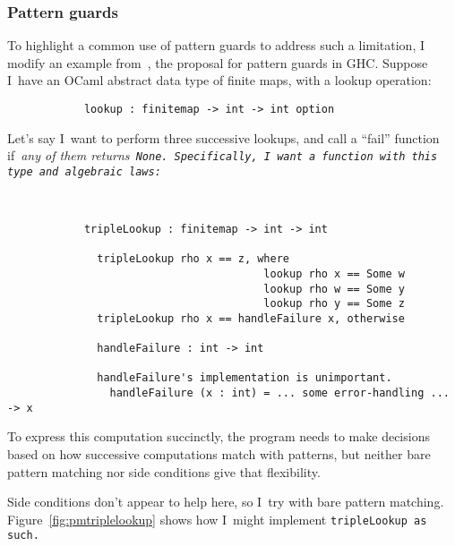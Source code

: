 \documentclass[manuscript,screen 12pt, nonacm]{acmart}
\begin{document}
    \subsubsection{Pattern guards}
    \label{guards}

    To highlight a common use of pattern guards to address such a limitation, I
    modify an example from~\citet{guardproposal}, the proposal for pattern
    guards in GHC. Suppose I~have an OCaml abstract data type of finite maps,
    with a lookup operation: 

    \begin{minipage}[t]{\textwidth}
        \centering 
        \begin{verbatim}
            lookup : finitemap -> int -> int option
        \end{verbatim}
    \end{minipage}
    Let's say I~want to perform three successive lookups, and call a “fail”
    function if~\it{any} of them returns~\tt{None}. Specifically, I~want a
    function with this type and algebraic laws: 

    \begin{minipage}[t]{\textwidth}
        \centering 
        \begin{verbatim}
          

            tripleLookup : finitemap -> int -> int

              tripleLookup rho x == z, where 
                                        lookup rho x == Some w
                                        lookup rho w == Some y
                                        lookup rho y == Some z
              tripleLookup rho x == handleFailure x, otherwise
            
              handleFailure : int -> int 

              handleFailure's implementation is unimportant.
                handleFailure (x : int) = ... some error-handling ... -> x  

        \end{verbatim}
    \end{minipage}

    To express this computation succinctly, the program needs to make decisions
    based on how successive computations match with patterns, but neither bare
    pattern matching nor side conditions give that flexibility. 
    
    Side conditions don't appear to help here, so I~try with bare pattern
    matching. Figure~\ref{fig:pmtriplelookup} shows how I~might implement
    \tt{tripleLookup} as such. 
\end{document}
